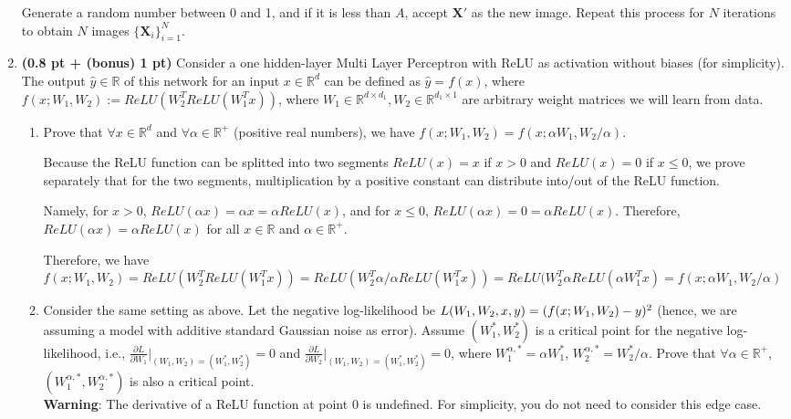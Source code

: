 \begin{enumerate}
Generate a random number between 0 and 1, and if it is less than $A$, accept
$\mathbf{X}'$ as the new image. Repeat this process for $N$ iterations to obtain
$N$ images $\{\mathbf{X}_i\}_{i=1}^N$.

\vspace{3.5in}


\item {\bf (0.8 pt + (bonus) 1 pt)} Consider a one hidden-layer Multi Layer Perceptron with ReLU as activation without biases (for simplicity). The output $\hat{y}\in \mathbb{R}$ of this network for an input $x \in \mathbb{R}^d$ can be defined as $\hat{y} = f(x)$, where $f(x; W_1,W_2) := ReLU(W_2^T  ReLU( W_1^T x))$, where $W_1\in \mathbb{R}^{d\times d_1},W_2\in \mathbb{R}^{d_1\times 1}$ are arbitrary weight matrices we will learn from data.
\begin{enumerate}
    \item Prove that $\forall x \in \mathbb{R}^d$ and $\forall \alpha \in \mathbb{R}^+$ (positive real numbers), we have $f(x; W_1,W_2) = f(x; \alpha W_1,W_2/\alpha)$.

    Because the ReLU function can be splitted into two segments $ReLU(x) = x$ if
    $x > 0$ and $ReLU(x) = 0$ if $x \leq 0$, we prove separately that for the two segments,
    multiplication by a positive constant can distribute into/out of the ReLU function.
    
    Namely, for $x > 0$, $ReLU(\alpha x) = \alpha x = \alpha ReLU(x)$, and for
    $x \leq 0$, $ReLU(\alpha x) = 0 = \alpha ReLU(x)$. Therefore, $ReLU(\alpha
    x) = \alpha ReLU(x)$ for all $x \in \mathbb{R}$ and $\alpha \in
    \mathbb{R}^+$.

    Therefore, we have $f(x; W_1, W_2) = ReLU(W_2^T ReLU(W_1^T x)) = ReLU(W_2^T
    \alpha / \alpha ReLU(W_1^T x)) = ReLU(W_2^T\alpha ReLU(\alpha W_1^T x) =
    f(x; \alpha W_1,W_2/\alpha)$

    \vspace{1.5in}

    \item  
  Consider the same setting as above. Let the negative log-likelihood be $L(W_1, W_2, x, y) = (f(x; \\W_1,W_2) - y)^2$ (hence, we are assuming a model with additive standard Gaussian noise as error). Assume $(W^*_1,W^*_2)$ is a critical point for the negative log-likelihood, i.e., $\frac{\partial L}{\partial W_1}|_{(W_1,W_2) = (W^*_1,W^*_2)}=0$ and $\frac{\partial L}{\partial W_2}|_{(W_1,W_2) = (W^*_1,W^*_2)}=0$, where $W^{\alpha,*}_1=\alpha W^*_1$, $W^{\alpha,*}_2=W^*_2/\alpha$. Prove that $\forall \alpha \in \mathbb{R}^+$, $(W^{\alpha,*}_1, W^{\alpha,*}_2)$ is also a critical point. \\
  \textbf{Warning}: The derivative of a ReLU function at point $0$ is undefined. For simplicity, you do not need to consider this edge case.


\end{enumerate}
\end{enumerate}
